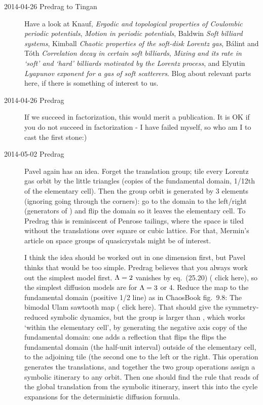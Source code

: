 \begin{description}
\item[2014-04-26 Predrag to Tingan]
Have a look at
Knauf,
{\em Ergodic and topological properties of {Coulombic} periodic potentials},
{\em Motion in periodic potentials},
Baldwin {\em Soft billiard systems},
Kimball
{\em Chaotic properties of the soft-disk {Lorentz} gas},
B\'alint and T\'oth
{\em Correlation decay in certain soft billiards},
{\em Mixing and its rate in `soft' and `hard' billiards
         motivated by the {Lorentz} process},
and
Elyutin
{\em Lyapunov exponent for a gas of soft scatterers}.
Blog about relevant parts here, if there is something of interest
to us.

\item[2014-04-26 Predrag]
If we succeed in factorization, this would merit a publication.
It is OK if you do not succeed in factorization - I have failed myself, so
who am I to cast the first stone:)

\item[2014-05-02 Predrag]
Pavel again has an idea. Forget the translation group; tile every Lorentz
gas orbit by the little triangles (copies of the fundamental domain,
1/12th of the elementary cell). Then the group orbit is generated by 3
elements (ignoring going through the corners): go to the domain to the
left/right (generators of ) and flip the domain so it leaves the
elementary cell. To Predrag this is reminiscent of Penrose tailings,
where the space is tiled without the translations over square or cubic
lattice. For that, Mermin's article on space groups of
quasicrystals might be of interest.

I think the idea should be worked out in one dimension first, but Pavel
thinks that would be too simple. Predrag believes that you always work
out the simplest model first. $\Lambda =2$ vanishes by eq.~(25.20)
( {click
here}), so the simplest diffusion models are for $\Lambda =3$ or $4$.
Reduce the map to the fundamental domain (positive 1/2 line) as in
ChaosBook fig.~9.8: The bimodal Ulam sawtooth map
( {click
here}). That should give the symmetry-reduced symbolic dynamics, but the
group is larger than , which works `within the elementary cell', by
generating the negative axis copy of the fundamental domain: one adds a
reflection that flips the flips the fundamental domain (the half-unit
interval) outside of the elementary cell, to the adjoining tile (the
second one to the left or the right. This operation generates the
translations, and together the two group operations assign a symbolic
itinerary to any orbit. Then one should find the rule that reads of the
global translation from the symbolic itinerary, insert this into the
cycle expansions for the deterministic diffusion formula.


\end{description}
